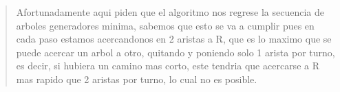 \begin{quote}
    Afortunadamente aqui piden que el algoritmo nos regrese la secuencia de arboles generadores minima, sabemos que esto se va a cumplir pues en cada paso estamos acercandonos en 2 aristas a R, que es lo maximo que se puede acercar un arbol a otro, quitando y poniendo solo 1 arista por turno, es decir, si hubiera un camino mas corto, este tendria que acercarse a R mas rapido que 2 aristas por turno, lo cual no es posible. \vspace{.2cm}
\end{quote}